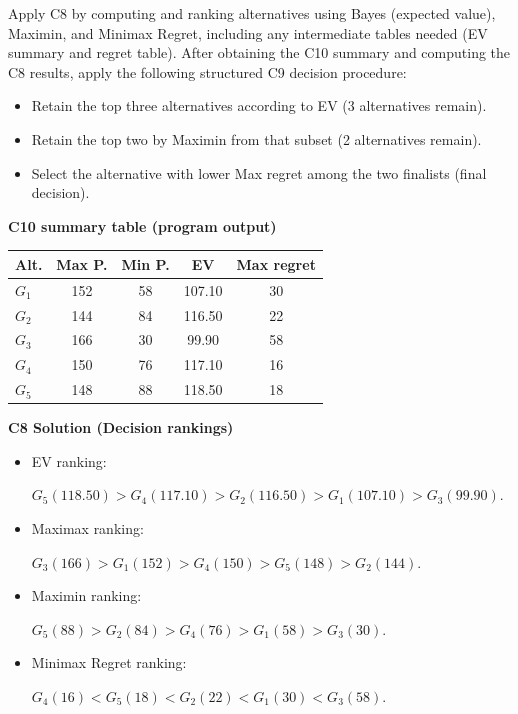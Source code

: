 \begin{ExamProblems}
		Apply C8 by computing and ranking alternatives using Bayes (expected value), Maximin, and Minimax Regret, including any intermediate tables needed (EV summary and regret table).
		After obtaining the C10 summary and computing the C8 results, apply the following structured C9 decision procedure:
		\begin{itemize}
			\item Retain the top three alternatives according to EV (3 alternatives remain).
			\item Retain the top two by Maximin from that subset (2 alternatives remain).
			\item Select the alternative with lower Max regret among the two finalists (final decision).
		\end{itemize}
		
		\vspace{0.25cm}
		
		\textbf{C10 summary table (program output)}\par
		\begin{center}
			\begin{tabular}{l c c c c}
				\hline
				Alt. & Max P. & Min P. & EV & Max regret \\
				\hline
				$G_1$ & 152 & 58 & 107.10 & 30 \\
				$G_2$ & 144 & 84 & 116.50 & 22 \\
				$G_3$ & 166 & 30 & 99.90 & 58 \\
				$G_4$ & 150 & 76 & 117.10 & 16 \\
				$G_5$ & 148 & 88 & 118.50 & 18 \\
				\hline
			\end{tabular}
		\end{center}
		
		\textbf{C8 Solution (Decision rankings)}\par
		\begin{itemize}
			\item EV ranking: \par $G_5(118.50)>G_4(117.10)>G_2(116.50)>G_1(107.10)>G_3(99.90)$.
			\item Maximax ranking:\par $G_3(166)>G_1(152)>G_4(150)>G_5(148)>G_2(144)$.
			\item Maximin ranking: \par $G_5(88)>G_2(84)>G_4(76)>G_1(58)>G_3(30)$.
			\item Minimax Regret ranking:\par $G_4(16)<G_5(18)<G_2(22)<G_1(30)<G_3(58)$.
		\end{itemize}
		

\end{ExamProblems}
